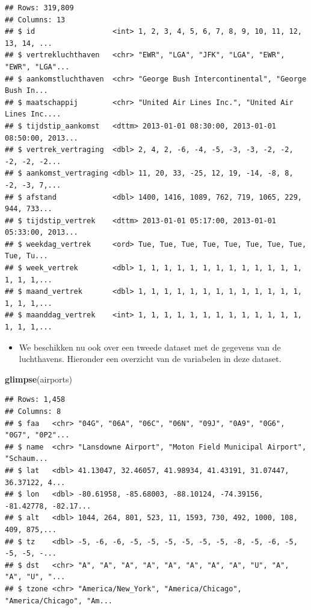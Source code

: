 \documentclass[]{tufte-book}
\newenvironment{Shaded}{}{}
\newcommand{\KeywordTok}[1]{\textcolor[rgb]{0.00,0.44,0.13}{\textbf{#1}}}
\newcommand{\NormalTok}[1]{#1}
\providecommand{\tightlist}{%
  \setlength{\itemsep}{0pt}\setlength{\parskip}{0pt}}
\begin{document}
\begin{verbatim}
## Rows: 319,809
## Columns: 13
## $ id                  <int> 1, 2, 3, 4, 5, 6, 7, 8, 9, 10, 11, 12, 13, 14, ...
## $ vertrekluchthaven   <chr> "EWR", "LGA", "JFK", "LGA", "EWR", "EWR", "LGA"...
## $ aankomstluchthaven  <chr> "George Bush Intercontinental", "George Bush In...
## $ maatschappij        <chr> "United Air Lines Inc.", "United Air Lines Inc....
## $ tijdstip_aankomst   <dttm> 2013-01-01 08:30:00, 2013-01-01 08:50:00, 2013...
## $ vertrek_vertraging  <dbl> 2, 4, 2, -6, -4, -5, -3, -3, -2, -2, -2, -2, -2...
## $ aankomst_vertraging <dbl> 11, 20, 33, -25, 12, 19, -14, -8, 8, -2, -3, 7,...
## $ afstand             <dbl> 1400, 1416, 1089, 762, 719, 1065, 229, 944, 733...
## $ tijdstip_vertrek    <dttm> 2013-01-01 05:17:00, 2013-01-01 05:33:00, 2013...
## $ weekdag_vertrek     <ord> Tue, Tue, Tue, Tue, Tue, Tue, Tue, Tue, Tue, Tu...
## $ week_vertrek        <dbl> 1, 1, 1, 1, 1, 1, 1, 1, 1, 1, 1, 1, 1, 1, 1, 1,...
## $ maand_vertrek       <dbl> 1, 1, 1, 1, 1, 1, 1, 1, 1, 1, 1, 1, 1, 1, 1, 1,...
## $ maanddag_vertrek    <int> 1, 1, 1, 1, 1, 1, 1, 1, 1, 1, 1, 1, 1, 1, 1, 1,...
\end{verbatim}

\begin{itemize}
\tightlist
\item
  We beschikken nu ook over een tweede dataset met de gegevens van de luchthavens. Hieronder een overzicht van de variabelen in deze dataset.
\end{itemize}

\begin{Shaded}
\begin{Highlighting}[]
\KeywordTok{glimpse}\NormalTok{(airports)}
\end{Highlighting}
\end{Shaded}

\begin{verbatim}
## Rows: 1,458
## Columns: 8
## $ faa   <chr> "04G", "06A", "06C", "06N", "09J", "0A9", "0G6", "0G7", "0P2"...
## $ name  <chr> "Lansdowne Airport", "Moton Field Municipal Airport", "Schaum...
## $ lat   <dbl> 41.13047, 32.46057, 41.98934, 41.43191, 31.07447, 36.37122, 4...
## $ lon   <dbl> -80.61958, -85.68003, -88.10124, -74.39156, -81.42778, -82.17...
## $ alt   <dbl> 1044, 264, 801, 523, 11, 1593, 730, 492, 1000, 108, 409, 875,...
## $ tz    <dbl> -5, -6, -6, -5, -5, -5, -5, -5, -5, -8, -5, -6, -5, -5, -5, -...
## $ dst   <chr> "A", "A", "A", "A", "A", "A", "A", "A", "U", "A", "A", "U", "...
## $ tzone <chr> "America/New_York", "America/Chicago", "America/Chicago", "Am...
\end{verbatim}
\end{document}
